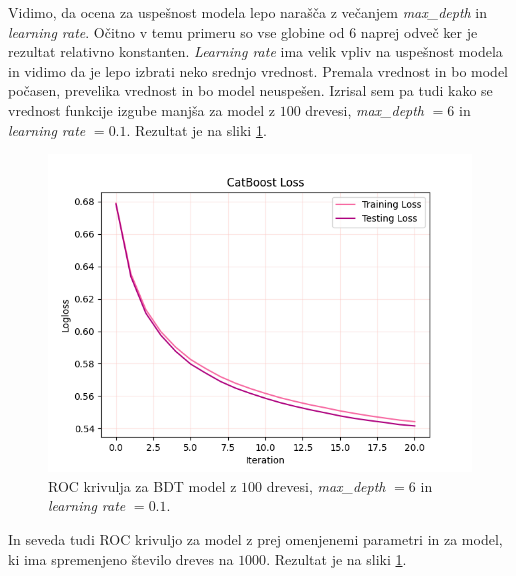 \documentclass[a4paper]{article}
\begin{document}
Vidimo, da ocena za uspešnost modela lepo narašča z večanjem \textit{max\_depth} in \textit{learning rate}. Očitno v temu 
primeru so vse globine od $6$ naprej odveč ker je rezultat relativno konstanten. \textit{Learning rate} ima velik vpliv 
na uspešnost modela in vidimo da je lepo izbrati neko srednjo vrednost. Premala vrednost in bo model počasen, prevelika
vrednost in bo model neuspešen. Izrisal sem pa tudi kako se vrednost funkcije izgube manjša za model z $100$ drevesi, 
\textit{max\_depth} $= 6$ in \textit{learning rate} $= 0.1$. Rezultat je na sliki \ref{fig:BDT_ROC}. \\

\begin{figure}[H]
    \centering
    \includegraphics[width=1\textwidth]{../images/catboost_loss.png}
    \caption{ROC krivulja za BDT model z $100$ drevesi, \textit{max\_depth} $= 6$ in \textit{learning rate} $= 0.1$.}
    \label{fig:BDT_ROC}
\end{figure}

In seveda tudi ROC krivuljo za model z prej omenjenemi parametri in za model, ki ima spremenjeno število dreves na $1000$. 
Rezultat je na sliki \ref{fig:BDT_ROC}. \\
\end{document}
